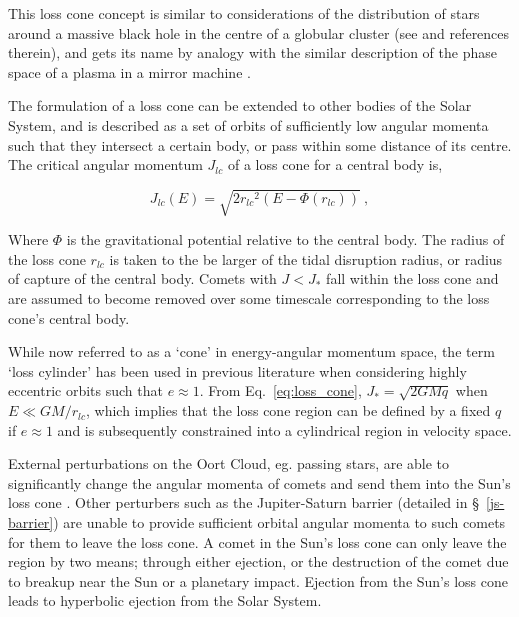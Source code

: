 This loss cone concept is similar to considerations of the distribution of stars around a massive black hole in the centre of a globular cluster (see \cite{1978ApJ...226.1087C} and references therein), and gets its name by analogy with the similar description of the phase space of a plasma in a mirror machine \citep{baldwin1972plasma}. 

The formulation of a loss cone can be extended to other bodies of the Solar System, and is described as a set of orbits of sufficiently low angular momenta such that they intersect a certain body, or pass within some distance of its centre. The critical angular momentum $J_{lc}$ of a loss cone for a central body is,

\begin{equation}
    J_{lc}(E) = \sqrt{ 2 {r_{lc}}^2 \left(E - \Phi(r_{lc})\right) }~,
    \label{eq:loss_cone}
\end{equation}

Where $\Phi$ is the gravitational potential relative to the central body. The radius of the loss cone $r_{lc}$ is taken to the be larger of the tidal disruption radius, or radius of capture of the central body. Comets with $J < J_{*}$ fall within the loss cone and are assumed to become removed over some timescale corresponding to the loss cone's central body. 

While now referred to as a `cone' in energy-angular momentum space, the term `loss cylinder' has been used in previous literature when considering highly eccentric orbits such that $e \approx 1$. From Eq.~\eqref{eq:loss_cone}, $J_* = \sqrt{2GMq}$ when $E \ll GM/r_{lc}$, which implies that the loss cone region can be defined by a fixed $q$ if $e \approx 1$ and is subsequently constrained into a cylindrical region in velocity space. %

External perturbations on the Oort Cloud, eg. passing stars, are able to significantly change the angular momenta of comets and send them into the Sun's loss cone \citep{1950BAN....11...91O}. Other perturbers such as the Jupiter-Saturn barrier (detailed in \S~\ref{js-barrier}) are unable to provide sufficient orbital angular momenta to such comets for them to leave the loss cone. A comet in the Sun's loss cone can only leave the region by two means; through either ejection, or the destruction of the comet due to breakup near the Sun or a planetary impact. Ejection from the Sun's loss cone leads to hyperbolic ejection from the Solar System. 

